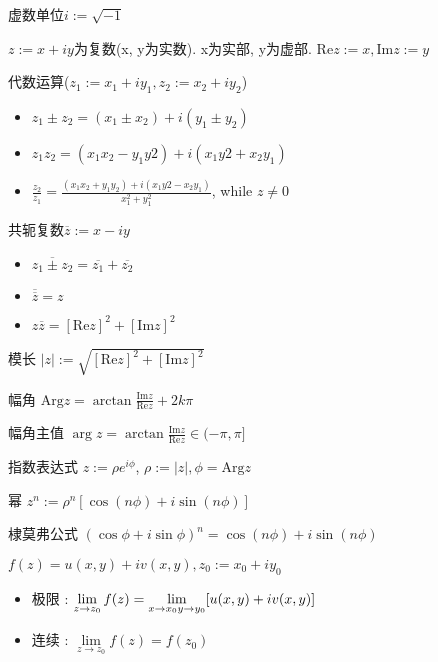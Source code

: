 \documentclass[UTF8, 12pt]{ctexart}
\begin{document}
	
	虚数单位$ i := \sqrt{-1} $

	$ z := x + iy $为复数(x, y为实数). x为实部, y为虚部. $ \mathrm{Re}z := x, \mathrm{Im}z := y $

	代数运算($ z_{1} := x_{1}+iy_{1}, z_{2} := x_{2}+iy_{2} $)
	\begin{itemize}[leftmargin = 4em]
		\item $ z_{1} \pm z_{2} = (x_{1} \pm x_{2}) + i(y_{1} \pm y_{2}) $
		\item $ z_{1}z_{2} = (x_{1}x_{2}-y_{1}y{2}) + i(x_{1}y{2}+x_{2}y_{1}) $
		\item $ \frac{z_{2}}{z_{1}} = \frac{(x_{1}x_{2}+y_{1}y_{2})+i(x_{1}y{2}-x_{2}y_{1})}{x_{1}^{2}+y_{1}^{2}} $, while $ z \ne 0 $
	\end{itemize}

	共轭复数$ \overline{z} := x - iy $
	\begin{itemize}[leftmargin = 4em]
		\item $ \overline{z_{1} \pm z_{2}} = \overline{z_{1}} + \overline{z_{2}} $
		\item $ \overline{\overline{z}} = z $
		\item $ z\overline{z} = [\mathrm{Re}z]^{2} + [\mathrm{Im}z]^{2} $
	\end{itemize}

	模长 $ |z| := \sqrt{[\mathrm{Re}z]^{2} + [\mathrm{Im}z]^{2}} $

	幅角 $ \mathrm{Arg}z = \arctan\frac{\mathrm{Im}z}{\mathrm{Re}z} + 2k\pi $

	幅角主值 $ \arg z = \arctan\frac{\mathrm{Im}z}{\mathrm{Re}z} \in (-\pi, \pi] $

	指数表达式 $ z := \rho e^{i\phi} $, $ \rho := |z|, \phi = \mathrm{Arg}z$

	幂 $ z^{n} := \rho^{n}[\cos(n\phi) + i\sin(n\phi)] $

	棣莫弗公式 $ (\cos\phi + i\sin\phi)^{n} = \cos(n\phi) + i\sin(n\phi) $

	$ f(z) = u(x, y) + iv(x, y) , z_{0} := x_{0} + iy_{0} $
	\begin{itemize}[leftmargin = 4em]
		\item 极限 : $ \lim\limits_{z \to z_{0}}f(z) =  \lim\limits_{x \to x_{0} \\ y \to y_{0}}[u(x, y) + iv(x, y)] $
		\item 连续 : $ \lim\limits_{z \to z_{0}}f(z) = f(z_{0}) $
	\end{itemize}
	
\end{document}
